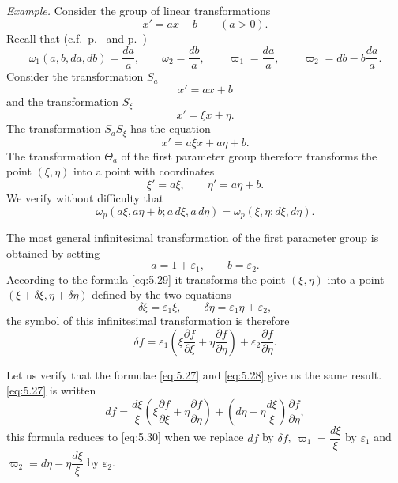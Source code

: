 \documentclass[leqno,11pt]{book}
\makeatletter
\numberwithin{equation}{chapter}
\newcommand{\pd}{\partial}
\theoremstyle{shape1}
\theoremstyle{shapesmall}
\let\old@epsilon\epsilon
\let\old@varepsilon\varepsilon
\let\epsilon\old@varepsilon
\let\varepsilon\old@epsilon
\newcommand{\vp}{\varpi}
\makeatother
\begin{document}
{\small

\emph{Example.} Consider the group of linear transformations
\[
x'=ax+b\qquad(a>0).
\]
Recall that (c.f.~p.~\pageref{sec:71} and p.~\pageref{sec:74})
\[
\omega_{1}(a,b,da,db)=\frac{da}{a},\qquad\omega_{2}=\frac{db}{a},\qquad\vp_{1}=\frac{da}{a},\qquad\vp_{2}=db-b\frac{da}{a}.
\]
Consider the transformation $S_{a}$
\[
x'=ax+b
\]
and the transformation $S_{\xi}$
\[
x'=\xi x+\eta.
\]
The transformation $S_{a}S_{\xi}$ has the equation
\[
x'=a\xi x+a\eta+b.
\]
The transformation $\Theta_{a}$ of the first parameter group therefore transforms the point $(\xi,\eta)$ into a point with coordinates
\begin{equation}
  \label{eq:5.29}
  \xi'=a\xi,\qquad\eta'=a\eta+b.
\end{equation}
We verify without difficulty that
\[
\omega_{p}(a\xi,a\eta+b;a\,d\xi,a\,d\eta)=\omega_{p}(\xi,\eta;d\xi,d\eta).
\]

The most general infinitesimal transformation of the first parameter group is obtained by setting
\[
a=1+\epsilon_{1},\qquad b=\epsilon_{2}.
\]
According to the formula \eqref{eq:5.29} it transforms the point $(\xi,\eta)$ into a point $(\xi+\delta\xi,\eta+\delta\eta)$ defined by the two equations
\[
\delta\xi=\epsilon_{1}\xi,\qquad\delta\eta=\epsilon_{1}\eta+\epsilon_{2},
\]
the symbol of this infinitesimal transformation is therefore
\begin{equation}
  \label{eq:5.30}
  \delta f=\epsilon_{1}\left(\xi\frac{\pd f}{\pd\xi}+\eta\frac{\pd f}{\pd\eta}\right)+\epsilon_{2}\frac{\pd f}{\pd \eta}.
\end{equation}

Let us verify that the formulae \eqref{eq:5.27} and \eqref{eq:5.28} give us the same result. \eqref{eq:5.27} is written
\[
df=\frac{d\xi}{\xi}\left(\xi\frac{\pd f}{\pd\xi}+\eta\frac{\pd f}{\pd\eta}\right)+\left(d\eta-\eta\frac{d\xi}{\xi}\right)\frac{\pd f}{\pd \eta},
\]
this formula reduces to \eqref{eq:5.30} when we replace $df$ by $\delta f$, $\vp_{1}=\dfrac{d\xi}{\xi}$ by $\epsilon_{1}$ and $\vp_{2}=d\eta-\eta\dfrac{d\xi}{\xi}$ by $\epsilon_{2}$.
}
\end{document}
